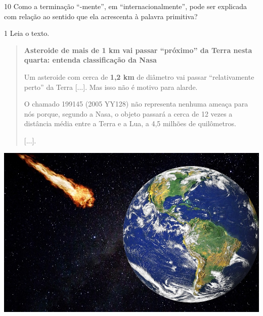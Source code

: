 \num{10} Como a terminação “-mente”, em “internacionalmente”, pode ser explicada com relação ao sentido que ela acrescenta à palavra primitiva?




\num{1} Leia o texto.\medskip

\begin{minipage}{.5\textwidth}
\begin{quote}
\textbf{Asteroide de mais de 1 km vai passar “próximo” da Terra nesta
quarta: entenda classificação da Nasa}

Um asteroide com cerca de \textbf{1,2 km} de diâmetro vai passar
“relativamente perto” da Terra {[}...{]}. Mas
isso não é motivo para alarde.

O chamado 199145 (2005 YY128) não representa nenhuma ameaça para nós
porque, segundo a Nasa, o
objeto passará a cerca de 12 vezes a distância média entre a Terra e a
Lua, a 4,5 milhões de quilômetros.

{[}...{]}.
\end{quote}
\end{minipage}\hspace{.2cm}
\begin{minipage}{.5\textwidth}
\includegraphics[width=\textwidth]{./imgs/img3.jpg}
\end{minipage}



